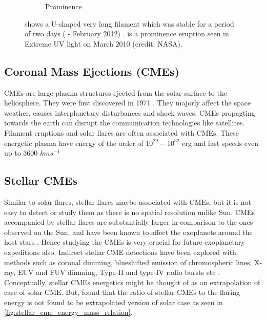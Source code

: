 \begin{figure}
\begin{subfigure}[b]{0.5\textwidth}
         \caption{Prominence}
         \label{fig:prominence}
     \end{subfigure}
     \caption[Filament and Prominence]{ shows a U-shaped very long filament which was stable for a period of two days ( -  February 2012) .  is a prominence eruption seen in Extreme UV light on  March 2010 (credit: NASA).}
     \label{fig:filament_prominence}
\end{figure}

\subsection{Coronal Mass Ejections (CMEs)}

CMEs are large plasma structures ejected from the solar surface to the heliosphere. They were first discovered in 1971 \citep{Gopalswamy2016-nm}. They majorly affect the space weather, causes interplanetary disturbances and shock waves. CMEs propagting towards the earth can disrupt the communication technologies like satellites. Filament eruptions and solar flares are often associated with CMEs. These energetic plasma have energy of the order of $10^{29} - 10^{32}$ erg and fast speeds even up to 3600 $kms^{-1}$

\subsection{Stellar CMEs}

Similar to solar flares, stellar flares maybe associated with CMEs, but it is not easy to detect or study them as there is no spatial resolution unlike Sun. CMEs accompanied by stellar flares are substantially larger in comparison to the ones observed on the Sun, and have been known to affect the exoplanets around the host stars \citep{Veronig2021-rf}. Hence studying the CMEs is very crucial for future exoplanetary expeditions also. Indirect stellar CME detections have been explored with methods such as coronal dimming, blueshifted emission of chromospheric lines, X-ray, EUV and FUV dimming, Type-II and type-IV radio bursts etc \citep{Korhonen2016-jo}. Conceptually, stellar CMEs energetics might be thought of as an extrapolation of case of solar CME. But, \citep{Argiroffi2019} found that the ratio of stellar CMEs to the flaring energy is not found to be extrapolated version of solar case as seen in \cref{fig:stellar_cme_energy_mass_relation}.

